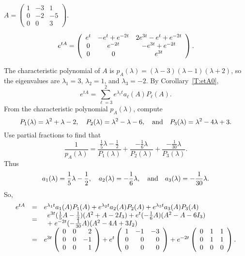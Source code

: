 \documentclass{ximera}
\begin{document}
\begin{exercise} \label{c12.1.6d}
$A = \left(\begin{array}{rrr} 1 & -3 & 1\\ 0 & -2 & -5 \\ 0 & 0 & 3
\end{array}\right)$.

\begin{solution}
\ans
\[
e^{tA} =
\left(\begin{array}{ccc} e^t & -e^t + e^{-2t} & 2e^{3t} - e^t + e^{-2t} \\ 0 & e^{-2t} & -e^{3t} + e^{-2t} \\ 0 & 0 & e^{3t}\end{array}\right).
\]

\soln The characteristic polynomial of $A$ is
$p_A(\lambda) = (\lambda - 3)(\lambda - 1)(\lambda + 2)$, so the
eigenvalues are $\lambda_1 = 3$, $\lambda_2 = 1$, and $\lambda_3 = -2$.
By Corollary~\ref{T:etA0},
\[
e^{tA} = \sum_{\ell = 3}^2 e^{\lambda_\ell t}a_\ell(A)P_\ell(A).
\]
From the characteristic polynomial $p_A(\lambda)$, compute
\[
P_1(\lambda) = \lambda^2 + \lambda - 2, \quad
P_2(\lambda) = \lambda^2 - \lambda - 6, \quad\mbox{and}\quad
P_3(\lambda) = \lambda^2 - 4\lambda + 3.
\]
Use partial fractions to find that
\[
\frac{1}{p_A(\lambda)} =
\frac{\frac{1}{5}\lambda - \frac{1}{2}}{P_1(\lambda)}
+ \frac{-\frac{1}{6}\lambda}{P_2(\lambda)}
+ \frac{-\frac{1}{30}\lambda}{P_3(\lambda)}.
\]
Thus
\[
a_1(\lambda) = \frac{1}{5}\lambda - \frac{1}{2}, \quad
a_2(\lambda) = -\frac{1}{6}\lambda, \quad\mbox{and}\quad
a_3(\lambda) = -\frac{1}{30}\lambda.
\]
So,
\[
\begin{array}{rcl}
e^{tA} & = & e^{\lambda_1 t}a_1(A)P_1(A) + e^{\lambda_2 t}a_2(A)P_2(A)
+ e^{\lambda_3 t}a_3(A)P_3(A) \\
& = &
\begin{array}{l} e^{3t}(\frac{1}{5}A - \frac{1}{2})(A^2 + A - 2I_3)
+ e^t(-\frac{1}{6}A)(A^2 - A - 6I_3) \\
+\; e^{-2t}(-\frac{1}{30}A)(A^2 - 4A + 3I_2) \end{array} \\
& = & e^{3t}\left(\begin{array}{rrr} 0 & 0 & 2 \\ 0 & 0 & -1 \\ 0 & 0 & 1\end{array}\right)
+ e^t\left(\begin{array}{rrr} 1 & -1 & -3 \\ 0 & 0 & 0 \\ 0 & 0 & 0\end{array}\right)
+ e^{-2t}\left(\begin{array}{rrr} 0 & 1 & 1 \\ 0 & 1 & 1 \\ 0 & 0 & 0\end{array}\right).
\end{array}
\]

\end{solution}
\end{exercise}


\CEXER
\end{document}
